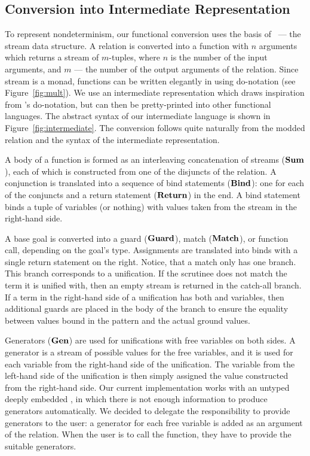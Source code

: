 

\subsection{Conversion into Intermediate Representation}

To represent nondeterminism, our functional conversion uses the basis of \mk~--- the stream data structure.
A relation is converted into a function with $n$ arguments which returns a stream of $m$-tuples, where $n$ is the number of the input arguments, and $m$ --- the number of the output arguments of the relation.
Since stream is a monad, functions can be written elegantly in \haskell using do-notation (see Figure~\ref{fig:mult}).
We use an intermediate representation which draws inspiration from \haskell's do-notation, but can then be pretty-printed into other functional languages.
The abstract syntax of our intermediate language is shown in Figure~\ref{fig:intermediate}.
The conversion follows quite naturally from the modded relation and the syntax of the intermediate representation.

A body of a function is formed as an interleaving concatenation of streams ($\operatorname{\mathbf{Sum}}$), each of which is constructed from one of the disjuncts of the relation.
A conjunction is translated into a sequence of bind statements ($\operatorname{\mathbf{Bind}}$): one for each of the conjuncts and a return statement ($\operatorname{\mathbf{Return}}$) in the end.
A bind statement binds a tuple of variables (or nothing) with values taken from the stream in the right-hand side.

A base goal is converted into a guard ($\operatorname{\mathbf{Guard}}$), match ($\operatorname{\mathbf{Match}}$), or function call, depending on the goal's type.
Assignments are translated into binds with a single return statement on the right.
Notice, that a match only has one branch.
This branch corresponds to a unification.
If the scrutinee does not match the term it is unified with, then an empty stream is returned in the catch-all branch.
If a term in the right-hand side of a unification has both \outm and \inm variables, then additional guards are placed in the body of the branch to ensure the equality between values bound in the pattern and the actual ground values.

Generators ($\operatorname{\mathbf{Gen}}$) are used for unifications with free variables on both sides.
A generator is a stream of possible values for the free variables, and it is used for each variable from the right-hand side of the unification.
The variable from the left-hand side of the unification is then simply assigned the value constructed from the right-hand side.
Our current implementation works with an untyped deeply embedded \mk, in which there is not enough information to produce generators automatically.
We decided to delegate the responsibility to provide generators to the user: a generator for each free variable is added as an argument of the relation.
When the user is to call the function, they have to provide the suitable generators.

